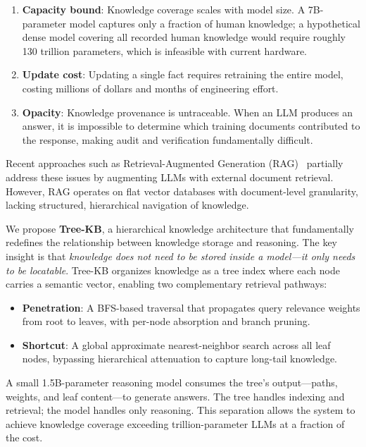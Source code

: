 \documentclass[11pt,a4paper]{article}
\begin{document}
\begin{enumerate}
    \item \textbf{Capacity bound}: Knowledge coverage scales with model size. A 7B-parameter model captures only a fraction of human knowledge; a hypothetical dense model covering all recorded human knowledge would require roughly 130 trillion parameters, which is infeasible with current hardware.
    \item \textbf{Update cost}: Updating a single fact requires retraining the entire model, costing millions of dollars and months of engineering effort.
    \item \textbf{Opacity}: Knowledge provenance is untraceable. When an LLM produces an answer, it is impossible to determine which training documents contributed to the response, making audit and verification fundamentally difficult.
\end{enumerate}

Recent approaches such as Retrieval-Augmented Generation (RAG)~\cite{lewis2020retrieval} partially address these issues by augmenting LLMs with external document retrieval. However, RAG operates on flat vector databases with document-level granularity, lacking structured, hierarchical navigation of knowledge.

We propose \textbf{Tree-KB}, a hierarchical knowledge architecture that fundamentally redefines the relationship between knowledge storage and reasoning. The key insight is that \textit{knowledge does not need to be stored inside a model---it only needs to be locatable}. Tree-KB organizes knowledge as a tree index where each node carries a semantic vector, enabling two complementary retrieval pathways:

\begin{itemize}
    \item \textbf{Penetration}: A BFS-based traversal that propagates query relevance weights from root to leaves, with per-node absorption and branch pruning.
    \item \textbf{Shortcut}: A global approximate nearest-neighbor search across all leaf nodes, bypassing hierarchical attenuation to capture long-tail knowledge.
\end{itemize}

A small 1.5B-parameter reasoning model consumes the tree's output---paths, weights, and leaf content---to generate answers. The tree handles indexing and retrieval; the model handles only reasoning. This separation allows the system to achieve knowledge coverage exceeding trillion-parameter LLMs at a fraction of the cost.
\end{document}
